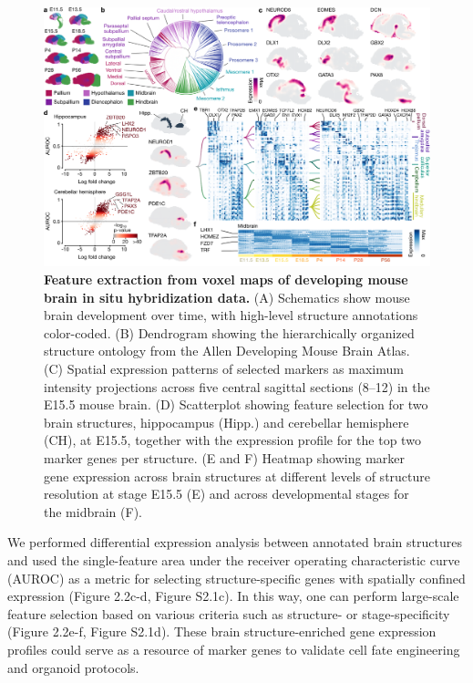\begin{figure}[t!]
    \centering
	\includegraphics[width=\textwidth]{figures/voxhunt/Figure_2}
    \caption{\textbf{Feature extraction from voxel maps of developing mouse brain in situ hybridization data.} (A) Schematics show mouse brain development over time, with high-level structure annotations color-coded. (B) Dendrogram showing the hierarchically organized structure ontology from the Allen Developing Mouse Brain Atlas. (C) Spatial expression patterns of selected markers as maximum intensity projections across five central sagittal sections (8–12) in the E15.5 mouse brain. (D) Scatterplot showing feature selection for two brain structures, hippocampus (Hipp.) and cerebellar hemisphere (CH), at E15.5, together with the expression profile for the top two marker genes per structure. (E and F) Heatmap showing marker gene expression across brain structures at different levels of structure resolution at stage E15.5 (E) and across developmental stages for the midbrain (F).}
    \label{fig:vox2}
\end{figure}


We performed differential expression analysis between annotated brain structures and used the single-feature area under the receiver operating characteristic curve (AUROC) as a metric for selecting structure-specific genes with spatially confined expression (Figure 2.2c-d, Figure S2.1c). In this way, one can perform large-scale feature selection based on various criteria such as structure- or stage-specificity (Figure 2.2e-f, Figure S2.1d). These brain structure-enriched gene expression profiles could serve as a resource of marker genes to validate cell fate engineering and organoid protocols.



